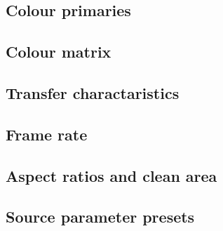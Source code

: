 \begin{informative*}
\subsection{Colour primaries}
\subsection{Colour matrix}
\subsection{Transfer charactaristics}
\subsection{Frame rate}
\subsection{Aspect ratios and clean area}
\end{informative*}
\subsection{Source parameter presets}


